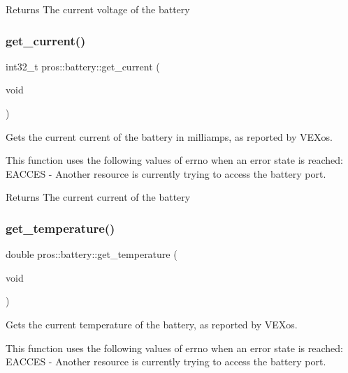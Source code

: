 \begin{DoxyReturn}{Returns}
The current voltage of the battery 
\end{DoxyReturn}
\mbox{\label{namespacepros_1_1battery_ad0f092e6341126d68ae15d41b5dba352}} 
\subsubsection{\texorpdfstring{get\+\_\+current()}{get\_current()}}
{\footnotesize\ttfamily int32\+\_\+t pros\+::battery\+::get\+\_\+current (\begin{DoxyParamCaption}\item[{void}]{ }\end{DoxyParamCaption})}

Gets the current current of the battery in milliamps, as reported by V\+E\+Xos.

This function uses the following values of errno when an error state is reached\+: E\+A\+C\+C\+ES -\/ Another resource is currently trying to access the battery port.

\begin{DoxyReturn}{Returns}
The current current of the battery 
\end{DoxyReturn}
\mbox{\label{namespacepros_1_1battery_a33d1a503808ed06148a1884e3ccf88ae}} 
\subsubsection{\texorpdfstring{get\+\_\+temperature()}{get\_temperature()}}
{\footnotesize\ttfamily double pros\+::battery\+::get\+\_\+temperature (\begin{DoxyParamCaption}\item[{void}]{ }\end{DoxyParamCaption})}

Gets the current temperature of the battery, as reported by V\+E\+Xos.

This function uses the following values of errno when an error state is reached\+: E\+A\+C\+C\+ES -\/ Another resource is currently trying to access the battery port.


